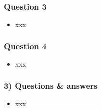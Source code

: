 \documentclass[english,14pt]{beamer}
\begin{document}

\begin{frame}[fragile]

\frametitle{Question 3}

\begin{itemize}
	\item xxx
\end{itemize}

\end{frame}


\begin{frame}[fragile]

\frametitle{Question 4}

\begin{itemize}
	\item xxx
\end{itemize}

\end{frame}


\begin{frame}[fragile]

\frametitle{3) Questions \& answers}

\begin{itemize}
	\item xxx
\end{itemize}

\end{frame}
\end{document}
